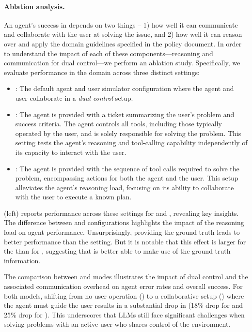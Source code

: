 \paragraph{Ablation analysis.}

An agent's success in \bench depends on two things -- 1) how well it can communicate and collaborate with the user at solving the issue, and 2) how well it can reason over and apply the domain guidelines specified in the policy document. In order to understand the impact of each of these components—reasoning and communication for dual control—we perform an ablation study. Specifically, we evaluate performance in the \telecom domain across three distinct settings:

\begin{itemize}
    \setlength\itemsep{0em}
    \item \textbf{\basemode}: The default agent and user simulator configuration where the agent and user collaborate in a \textit{dual-control} setup.
    \item \textbf{\solomode}: The agent is provided with a ticket summarizing the user's problem and success criteria. The agent controls all tools, including those typically operated by the user, and is solely responsible for solving the problem. This setting tests the agent's reasoning and tool-calling capability independently of its capacity to interact with the user.
    \item \textbf{\gtmode}: The agent is provided with the sequence of tool calls required to solve the problem, encompassing actions for both the agent and the user. This setup alleviates the agent's reasoning load, focusing on its ability to collaborate with the user to execute a known plan.
\end{itemize}


 (left) reports performance across these settings for \gptmodelshort and \ofourmodelshort, revealing key insights. 
The difference between \gtmode and \basemode configurations highlights the impact of the reasoning load on agent performance. 
Unsurprisingly, providing the ground truth leads to better performance than the \basemode setting. But it is notable that this effect is larger for the \ofourmodelshort than for \gptmodelshort, suggesting that \ofourmodelshort is better able to make use of the ground truth information.



The comparison between \solomode and \basemode modes illustrates the impact of dual control and the associated communication overhead on agent error rates and overall success. For both models, shifting from no user operation (\solomode) to a collaborative setup (\basemode) where the agent must guide the user results in a substantial drop in \passone (18\% drop for \gptmodelshort and 25\% drop for \ofourmodelshort).
This underscores that LLMs still face significant challenges when solving problems with an active user who shares control of the environment.

